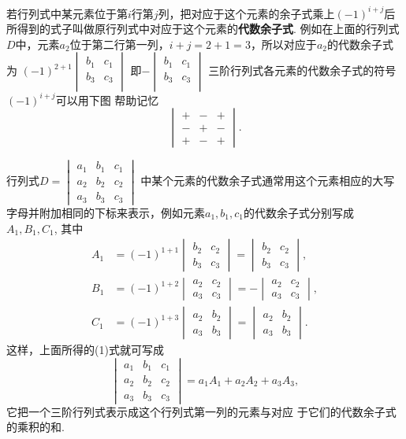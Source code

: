 若行列式中某元素位于第$i$行第$j$列，把对应于这个元素的余子式乘上$(-1)^{i+j}$后所得到的式子叫做原行列式中对应于这个元素的\textbf{代数余子式}. 例如在上面的行列式$D$中，元素$a_2$位于第二行第一列，$i+j=2+1=3$，所以对应于$a_2$的代数余子式为
$(-1)^{2+1}\begin{vmatrix}
  b_1&c_1\\
  b_3&c_3\\
\end{vmatrix}$
即$-\begin{vmatrix}
  b_1&c_1\\
  b_3&c_3\\
\end{vmatrix}$
三阶行列式各元素的代数余子式的符号$(-1)^{i+j}$可以用下图
帮助记忆
$$\begin{vmatrix}+&-&+\\-&+&-\\+&-&+\end{vmatrix}.$$

行列式$D=\begin{vmatrix}a_1&b_1&c_1\\a_2&b_2&c_2\\a_3&b_3&c_3\end{vmatrix}$
中某个元素的代数余子式通常用这个元素相应的大写字母并附加相同的下标来表示，例如元素$a_{1},b_{1},c_{1}$的代数余子式分别写成 $A_1,B_1,C_1$, 其中
\[\begin{split}
  A_{1}&=(-1)^{1+1}\begin{vmatrix}b_2&c_2\\b_3&c_3\end{vmatrix}=\begin{vmatrix}b_2&c_2\\b_3&c_3\end{vmatrix},\\
  B_{1}&=(-1)^{1+2}\begin{vmatrix}a_2&c_2\\a_3&c_3\end{vmatrix}=-\begin{vmatrix}a_2&c_2\\a_3&c_3\end{vmatrix},\\
  C_{1}&=(-1)^{1+3}\begin{vmatrix}a_2&b_2\\a_3&b_3\end{vmatrix}=\begin{vmatrix}a_2&b_2\\a_3&b_3\end{vmatrix}.\end{split}\]
这样，上面所得的(1)式就可写成
\begin{equation}
  \begin{vmatrix}a_1&b_1&c_1\\a_2&b_2&c_2\\a_3&b_3&c_3\end{vmatrix}=a_1A_1+a_2A_2+a_3A_3,\tag{2}
\end{equation}
它把一个三阶行列式表示成这个行列式第一列的元素与对应
于它们的代数余子式的乘积的和.

